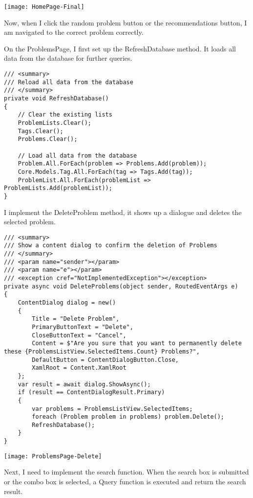 \documentclass[report.tex]{subfiles}
\begin{document}
\texttt{[image: HomePage-Final]}

Now, when I click the random problem button or the recommendations button, I am navigated to the correct problem correctly.

On the ProblemsPage, I first set up the RefreshDatabase method. It loads all data from the database for further queries.

\begin{verbatim}
/// <summary>
/// Reload all data from the database
/// </summary>
private void RefreshDatabase()
{
    // Clear the existing lists
    ProblemLists.Clear();
    Tags.Clear();
    Problems.Clear();

    // Load all data from the database
    Problem.All.ForEach(problem => Problems.Add(problem));
    Core.Models.Tag.All.ForEach(tag => Tags.Add(tag));
    ProblemList.All.ForEach(problemList => ProblemLists.Add(problemList));
}
\end{verbatim}

I implement the DeleteProblem method, it shows up a dialogue and deletes the selected problem.

\begin{verbatim}
/// <summary>
/// Show a content dialog to confirm the deletion of Problems
/// </summary>
/// <param name="sender"></param>
/// <param name="e"></param>
/// <exception cref="NotImplementedException"></exception>
private async void DeleteProblems(object sender, RoutedEventArgs e)
{
    ContentDialog dialog = new()
    {
        Title = "Delete Problem",
        PrimaryButtonText = "Delete",
        CloseButtonText = "Cancel",
        Content = $"Are you sure that you want to permanently delete these {ProblemsListView.SelectedItems.Count} Problems?",
        DefaultButton = ContentDialogButton.Close,
        XamlRoot = Content.XamlRoot
    };
    var result = await dialog.ShowAsync();
    if (result == ContentDialogResult.Primary)
    {
        var problems = ProblemsListView.SelectedItems;
        foreach (Problem problem in problems) problem.Delete();
        RefreshDatabase();
    }
}
\end{verbatim}

\texttt{[image: ProblemsPage-Delete]}

Next, I need to implement the search function. When the search box is submitted or the combo box is selected, a Query function is executed and return the search result.
\end{document}
